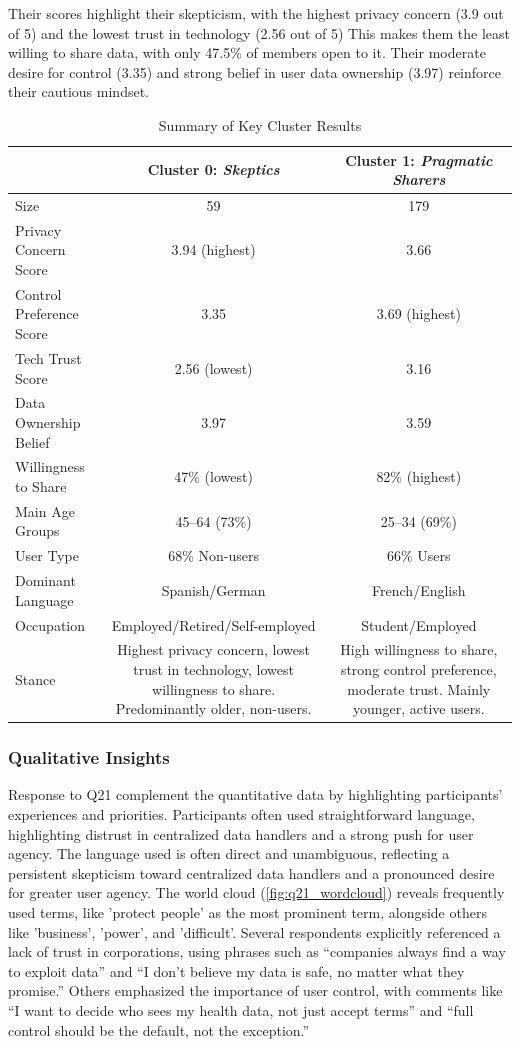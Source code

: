 Their scores highlight their skepticism, with the highest privacy concern (3.9 out of 5) and the lowest trust in technology (2.56 out of 5) This makes them the least willing to share data, with only 47.5\% of members open to it. Their moderate desire for control (3.35) and strong belief in user data ownership (3.97) reinforce their cautious mindset.

\begin{table}[ht] 
	\centering
	\begin{tabular}{lcc}
		\toprule
		& \textbf{Cluster 0: \textit{Skeptics}} & \textbf{Cluster 1: \textit{Pragmatic Sharers}} \\
		\midrule
		Size & 59 & 179 \\
		Privacy Concern Score & 3.94 (highest) & 3.66 \\
		Control Preference Score & 3.35 & 3.69 (highest) \\
		Tech Trust Score & 2.56 (lowest) & 3.16 \\
		Data Ownership Belief & 3.97 & 3.59 \\
		Willingness to Share & 47\% (lowest) & 82\% (highest) \\
		Main Age Groups & 45--64 (73\%) & 25--34 (69\%) \\
		User Type & 68\% Non-users & 66\% Users \\
		Dominant Language & Spanish/German & French/English \\
		Occupation & Employed/Retired/Self-employed & Student/Employed \\
		\midrule
		Stance & \parbox{6cm}{Highest privacy concern, lowest trust in technology, lowest willingness to share. Predominantly older, non-users.} & \parbox{6cm}{High willingness to share, strong control preference, moderate trust. Mainly younger, active users.} \\
		\bottomrule
	\end{tabular}
	\caption{Summary of Key Cluster Results}
	\label{tab:cluster_summary_brief}
\end{table}
	\subsubsection{Qualitative Insights}
		Response to Q21 complement the quantitative data by highlighting participants' experiences and priorities. Participants often used straightforward language, highlighting distrust in centralized data handlers and a strong push for user agency. The language used is often direct and unambiguous, reflecting a persistent skepticism toward centralized data handlers and a pronounced desire for greater user agency.
		The world cloud (\autoref{fig:q21_wordcloud}) reveals frequently used terms, like 'protect people' as the most prominent term, alongside others like 'business', 'power', and 'difficult'. Several respondents explicitly referenced a lack of trust in corporations, using phrases such as “companies always find a way to exploit data” and “I don’t believe my data is safe, no matter what they promise.” Others emphasized the importance of user control, with comments like “I want to decide who sees my health data, not just accept terms” and “full control should be the default, not the exception.”
		
